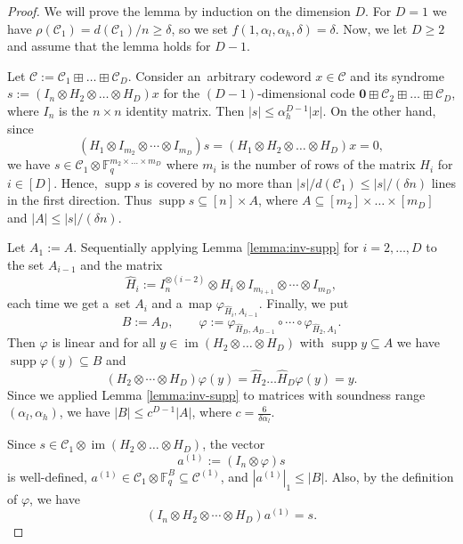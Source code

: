 \documentclass[10pt,a4paper]{amsart}
\DeclareMathOperator{\im}{im}
\DeclareMathOperator{\supp}{supp}
\let\ge\geqslant
\let\phi\varphi
\let\le\leqslant
\let\phi\varphi
\newcommand{\F}{\mathbb{F}}
\newcommand{\cC}{\mathcal{C}}
\begin{document}
\begin{proof}
We will prove the lemma by induction on the dimension $D$. For $D=1$ we have $\rho(\cC_1)=d(\cC_1)/n \ge \delta$, so we set $f(1,\alpha_l,\alpha_h,\delta)=\delta$. Now, we let $D\ge 2$ and assume that the lemma holds for $D-1$.

Let $\cC:=\cC_1\boxplus \dots\boxplus \cC_D$. 
Consider an~arbitrary codeword $x\in \cC$ and its syndrome $s:=(I_n\otimes H_2\otimes \dots\otimes H_D) x$ for the $(D-1)$-dimensional code $\mathbf{0}\boxplus \cC_2\boxplus\dots\boxplus \cC_D$, where $I_n$ is the $n\times n$ identity matrix. 
Then $|s|\le \alpha_h^{D-1}|x|$. 
On the other hand, since
\[(H_1\otimes I_{m_2}\otimes \cdots \otimes I_{m_D})s=(H_1\otimes H_2\otimes \dots\otimes H_D) x=0,\]
we have $s\in \cC_1\otimes \F_q^{m_2\times \dots\times m_D}$ where $m_i$ is the number of rows of the matrix $H_i$ for $i\in [D]$. 
Hence, $\supp s$ is covered by no more than $|s|/d(\cC_1)\le|s|/(\delta n)$ lines in the first direction. Thus $\supp s\subseteq [n]\times A$, where $A\subseteq [m_2]\times \dots\times [m_D]$ and $|A|\le |s|/(\delta n)$.

Let $A_1:=A$. 
Sequentially applying Lemma \ref{lemma:inv-supp} for $i=2,\dots,D$ to the set $A_{i-1}$ and the matrix 
\[
    \hat H_{i}:=I_n^{\otimes (i-2)}\otimes H_{i}\otimes I_{m_{i+1}}\otimes \cdots\otimes I_{m_D},
\] 
each time we get a~set $A_{i}$ and a~map $\phi_{\hat H_i, A_{i-1}}$. 
Finally, we put \[
    B:=A_D,\qquad \phi:=\phi_{\hat H_D,A_{D-1}}\circ \cdots\circ\phi_{\hat H_2, A_1}.
\] 
Then $\phi$ is linear and for all $y\in \im (H_2\otimes \dots \otimes H_D)$ with $\supp y\subseteq A$ we have $\supp \phi(y)\subseteq B$ and \[
    (H_2\otimes \cdots\otimes H_D) \phi(y)=\hat{H}_2\ldots \hat H_D \phi(y)=y.
\] 
Since we applied Lemma \ref{lemma:inv-supp} to matrices with soundness range $(\alpha_l,\alpha_h)$, we have $|B|\le c^{D-1}|A|$, where $c=\frac{6}{\delta \alpha_l}$.

Since $s\in \cC_1\otimes \im (H_2\otimes \dots \otimes H_D)$, the vector \[a^{(1)}:=(I_n\otimes \phi)s\] is well-defined, $a^{(1)}\in \cC_1\otimes \F_q^B\subseteq \cC^{(1)}$, and $|a^{(1)}|_1\le |B|$. Also, by the definition of $\phi$, we have \[(I_n\otimes H_2\otimes\cdots\otimes H_D)a^{(1)}=s.\]


\end{proof}
\end{document}
